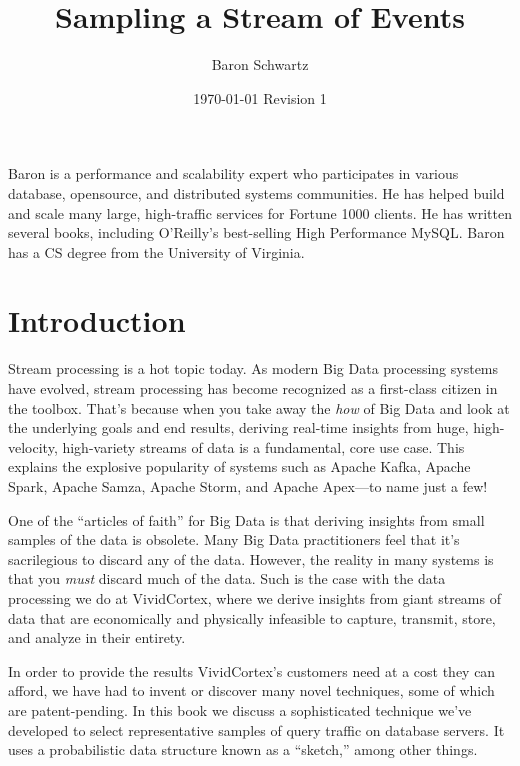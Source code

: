 \documentclass{vivid_layout}
\title{\fontsize{32pt}{15pt}\selectfont Sampling a Stream of Events}{\fontsize{30.2pt}{15pt}\selectfont With a Probabilistic Sketch}
\date{\color{white} \today{} \textbullet{} Revision 1}
\author{Baron Schwartz}{img/baron}
\begin{document}
\maketitle		%
\begin{bio}		%
Baron is a performance and scalability expert who participates in various
database, opensource, and distributed systems communities. He has helped build
and scale many large, high-traffic services for Fortune 1000 clients. He has
written several books, including O'Reilly's best-selling High Performance MySQL.
Baron has a CS degree from the University of Virginia.
\end{bio}
\tableofcontents	%

\section{Introduction}

Stream processing is a hot topic today. As modern Big Data processing systems
have evolved, stream processing has become recognized as a first-class citizen
in the toolbox. That's because when you take away the \emph{how} of Big Data and
look at the underlying goals and end results, deriving real-time insights from
huge, high-velocity, high-variety streams of data is a fundamental, core use
case. This explains the explosive popularity of systems such as Apache Kafka,
Apache Spark, Apache Samza, Apache Storm, and Apache Apex---to name just a few!

One of the ``articles of faith'' for Big Data is that deriving insights from
small samples of the data is obsolete. Many Big Data practitioners feel that
it's sacrilegious to discard any of the data. However, the reality in many
systems is that you \emph{must} discard much of the data. Such is the case with
the data processing we do at VividCortex, where we derive insights from giant
streams of data that are economically and physically infeasible to capture,
transmit, store, and analyze in their entirety.

In order to provide the results VividCortex's customers need at a cost they can
afford, we have had to invent or discover many novel techniques, some of which
are patent-pending. In this book we discuss a sophisticated technique we've
developed to select representative samples of query traffic on database servers.
It uses a probabilistic data structure known as a ``sketch,'' among other
things.
\end{document}
